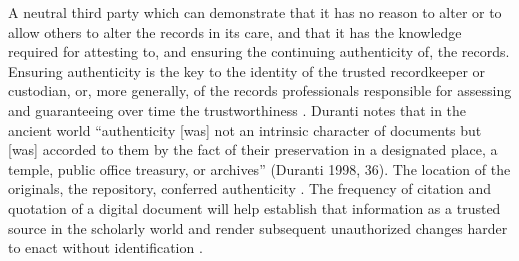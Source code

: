 A neutral third party which can demonstrate that it has no reason to alter or to allow others to alter the records in its care, and that it has the knowledge required for attesting to, and ensuring the continuing authenticity of, the records.  Ensuring authenticity is the key to the identity of the trusted recordkeeper or custodian, or, more  generally, of the records professionals responsible for assessing and guaranteeing over time the trustworthiness \cite[41]{duranti2009digital}.
Duranti notes that in the ancient world “authenticity [was] not an intrinsic character of documents but [was] accorded to them by the fact of their preservation in a designated place, a temple, public office treasury, or archives” (Duranti 1998, 36). The location of the originals, the repository, conferred authenticity \cite[29]{kirschenbaum2010digital}.
The frequency of citation and quotation of a digital document will help establish that information as a trusted source in the scholarly world and render subsequent unauthorized changes harder to enact without identification \cite[29]{kirschenbaum2010digital}.